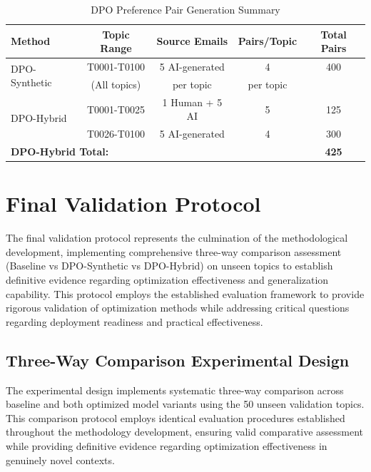 \begin{table}[htbp]
    \centering
    \caption[DPO Preference Pair Generation Summary]{DPO Preference Pair Generation Summary}
    \label{tab:dpo-data-preparation}
    \begin{tabular}{|l|c|c|c|c|}
    \hline
    \textbf{Method} & \textbf{Topic Range} & \textbf{Source Emails} & \textbf{Pairs/Topic} & \textbf{Total Pairs} \\
    \hline
    \multirow{2}{*}{DPO-Synthetic} & T0001-T0100 & 5 AI-generated & 4 & 400 \\
    & (All topics) & per topic & per topic & \\
    \hline
    \multirow{2}{*}{DPO-Hybrid} & T0001-T0025 & 1 Human + 5 AI & 5 & 125 \\
    & T0026-T0100 & 5 AI-generated & 4 & 300 \\
    \hline
    \multicolumn{4}{|l|}{\textbf{DPO-Hybrid Total:}} & \textbf{425} \\
    \hline
    \end{tabular}
\end{table}

\section{Final Validation Protocol}
\label{sec:final-validation-protocol}

The final validation protocol represents the culmination of the methodological development, implementing comprehensive three-way comparison assessment (Baseline vs DPO-Synthetic vs DPO-Hybrid) on unseen topics to establish definitive evidence regarding optimization effectiveness and generalization capability. This protocol employs the established evaluation framework to provide rigorous validation of optimization methods while addressing critical questions regarding deployment readiness and practical effectiveness.

\subsection{Three-Way Comparison Experimental Design}

The experimental design implements systematic three-way comparison across baseline and both optimized model variants using the 50 unseen validation topics. This comparison protocol employs identical evaluation procedures established throughout the methodology development, ensuring valid comparative assessment while providing definitive evidence regarding optimization effectiveness in genuinely novel contexts.

